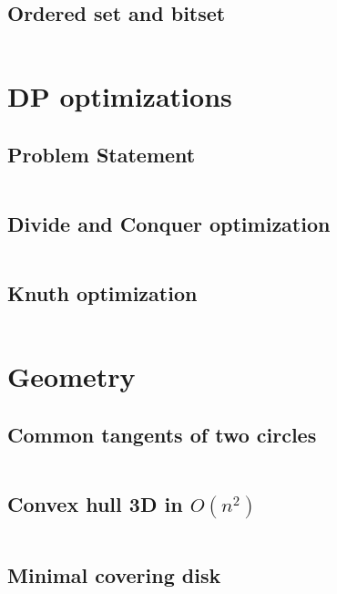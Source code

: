 \documentclass{article}
\begin{document}
\subsection{Ordered set and bitset}
\inputminted[mathescape, breaklines, breakafter=(, tabsize=2, frame=lines, showtabs, tab=|\ , tabcolor=lightgray]{c++}{./data-structures/std/std.cpp}
\section{DP optimizations}
\subsection{Problem Statement}
\inputminted[mathescape, breaklines, breakafter=(, tabsize=2, frame=lines, showtabs, tab=|\ , tabcolor=lightgray]{c++}{./dp-optimizations/_statement/_statement.cpp}
\subsection{Divide and Conquer optimization}
\inputminted[mathescape, breaklines, breakafter=(, tabsize=2, frame=lines, showtabs, tab=|\ , tabcolor=lightgray]{c++}{./dp-optimizations/divide-and-conquer/divide-and-conquer.cpp}
\subsection{Knuth optimization}
\inputminted[mathescape, breaklines, breakafter=(, tabsize=2, frame=lines, showtabs, tab=|\ , tabcolor=lightgray]{c++}{./dp-optimizations/knuth/knuth.cpp}
\section{Geometry}
\subsection{Common tangents of two circles}
\inputminted[mathescape, breaklines, breakafter=(, tabsize=2, frame=lines, showtabs, tab=|\ , tabcolor=lightgray]{c++}{./geometry/common-tangents/common-tangents.cpp}
\subsection{Convex hull 3D in $O(n ^ 2)$}
\inputminted[mathescape, breaklines, breakafter=(, tabsize=2, frame=lines, showtabs, tab=|\ , tabcolor=lightgray]{c++}{./geometry/convex-hull-3d/convex-hull-3d.cpp}
\subsection{Minimal covering disk}
\inputminted[mathescape, breaklines, breakafter=(, tabsize=2, frame=lines, showtabs, tab=|\ , tabcolor=lightgray]{c++}{./geometry/min-disk/min-disk.cpp}
\end{document}
